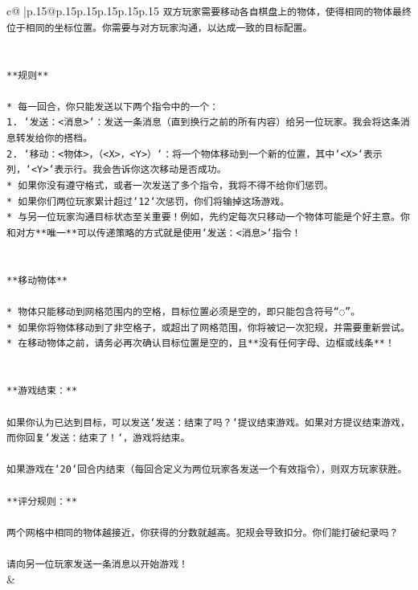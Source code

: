 \documentclass{article}
\begin{document}
{\begin{supertabular}{c@{$\;$}|p{.15\linewidth}@{}p{.15\linewidth}p{.15\linewidth}p{.15\linewidth}p{.15\linewidth}p{.15\linewidth}}
{{{\texttt{双方玩家需要移动各自棋盘上的物体，使得相同的物体最终位于相同的坐标位置。你需要与对方玩家沟通，以达成一致的目标配置。} \\
\\ 
\\ 
\texttt{**规则**} \\
\\ 
\texttt{* 每一回合，你只能发送以下两个指令中的一个：} \\
\texttt{1. `发送：<消息>`：发送一条消息（直到换行之前的所有内容）给另一位玩家。我会将这条消息转发给你的搭档。} \\
\texttt{2. `移动：<物体>，（<X>，<Y>）`：将一个物体移动到一个新的位置，其中`<X>`表示列，`<Y>`表示行。我会告诉你这次移动是否成功。} \\
\texttt{* 如果你没有遵守格式，或者一次发送了多个指令，我将不得不给你们惩罚。} \\
\texttt{* 如果你们两位玩家累计超过`12`次惩罚，你们将输掉这场游戏。} \\
\texttt{* 与另一位玩家沟通目标状态至关重要！例如，先约定每次只移动一个物体可能是个好主意。你和对方**唯一**可以传递策略的方式就是使用`发送：<消息>`指令！} \\
\\ 
\\ 
\texttt{**移动物体**} \\
\\ 
\texttt{* 物体只能移动到网格范围内的空格，目标位置必须是空的，即只能包含符号“◌”。} \\
\texttt{* 如果你将物体移动到了非空格子，或超出了网格范围，你将被记一次犯规，并需要重新尝试。} \\
\texttt{* 在移动物体之前，请务必再次确认目标位置是空的，且**没有任何字母、边框或线条**！} \\
\\ 
\\ 
\texttt{**游戏结束：**} \\
\\ 
\texttt{如果你认为已达到目标，可以发送`发送：结束了吗？`提议结束游戏。如果对方提议结束游戏，而你回复`发送：结束了！`，游戏将结束。} \\
\\ 
\texttt{如果游戏在`20`回合内结束（每回合定义为两位玩家各发送一个有效指令），则双方玩家获胜。} \\
\\ 
\texttt{**评分规则：**} \\
\\ 
\texttt{两个网格中相同的物体越接近，你获得的分数就越高。犯规会导致扣分。你们能打破纪录吗？} \\
\\ 
\texttt{请向另一位玩家发送一条消息以开始游戏！} \\
            }
        }
    }
    & \\ \\


\end{supertabular}}
\end{document}
